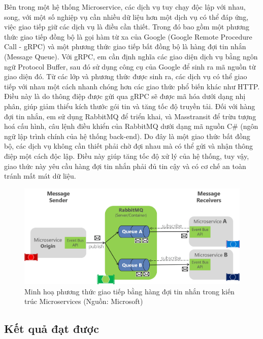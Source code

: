\documentclass[../DoAn.tex]{subfiles}
\begin{document}
Bên trong một hệ thống Microservice, các dịch vụ tuy chạy độc lập với nhau, song, với một số nghiệp vụ cần nhiều dữ liệu hơn một dịch vụ có thể đáp ứng, việc giao tiếp
giữ các dịch vụ là điều cần thiết. Trong đó bao gồm một phương thức giao tiếp đồng bộ là gọi hàm từ xa của Google (Google Remote Procedure Call - gRPC) và một phương thức giao tiếp bất đồng bộ là
hàng đợi tin nhắn (Message Queue). Với gRPC, em cần định nghĩa các giao diện dịch vụ bằng ngôn ngữ Protocol Buffer, sau đó sử dụng công cụ của Google để sinh ra mã nguồn từ giao diện đó.
Từ các lớp và phương thức được sinh ra, các dịch vụ có thể giao tiếp với nhau một cách nhanh chóng hơn các giao thức phổ biến khác như HTTP. Điều này là do thông điệp
được gửi qua gRPC sẽ được mã hóa dưới dạng nhị phân, giúp giảm thiểu kích thước gói tin và tăng tốc độ truyền tải. Đối với hàng đợi tin nhắn, em sử dụng RabbitMQ để triển khai,
và Masstransit để trừu tượng hoá cấu hình, câu lệnh điều khiển của RabbitMQ dưới dạng mã nguồn C\# (ngôn ngữ lập trình chính của hệ thống back-end). Do đây là một giao thức bất đồng bộ,
các dịch vụ không cần thiết phải chờ đợi nhau mà có thể gửi và nhận thông điệp một cách độc lập. Điều này giúp tăng tốc độ xử lý của hệ thống, tuy vậy, giao thức này yêu cầu
hàng đợi tin nhắn phải đủ tin cậy và có cơ chế an toàn tránh mất mát dữ liệu.

\begin{figure}[H]
    \centering
    \includegraphics[width=1.0\linewidth]{Hinhve/Example_RabbitMQ.png}
    \caption{Minh hoạ phương thức giao tiếp bằng hàng đợi tin nhắn trong kiến trúc Microservices (Nguồn: Microsoft)}
    \label{fig:Example_Kubernetes}
\end{figure}

\newpage

\subsection{Kết quả đạt được}
\label{subsection:5.1.3}
\end{document}
